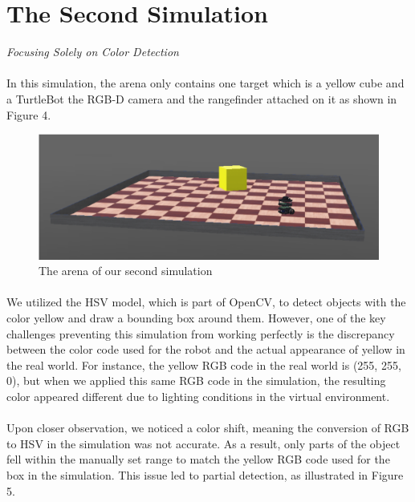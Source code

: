 \section{The Second Simulation}
\textit{Focusing Solely on Color Detection}

\paragraph*{}
In this simulation, the arena only contains one target which is a yellow cube and a TurtleBot the RGB-D camera and the rangefinder attached on it as shown in Figure 4.

\begin{figure}[H]
    \centering
    \includegraphics[width=0.8\linewidth]{assets/images/object_detection/Figure4.png}
    \caption{The arena of our second simulation}
    \label{fig:object detection figure 4.} 
\end{figure}

\paragraph*{}
We utilized the HSV model, which is part of OpenCV, to detect objects with the color yellow and draw a bounding box around them. However, one of the key challenges preventing this simulation from working perfectly is the discrepancy between the color code used for the robot and the actual appearance of yellow in the real world. For instance, the yellow RGB code in the real world is (255, 255, 0), but when we applied this same RGB code in the simulation, the resulting color appeared different due to lighting conditions in the virtual environment.

\paragraph*{}
Upon closer observation, we noticed a color shift, meaning the conversion of RGB to HSV in the simulation was not accurate. As a result, only parts of the object fell within the manually set range to match the yellow RGB code used for the box in the simulation. This issue led to partial detection, as illustrated in Figure 5.

